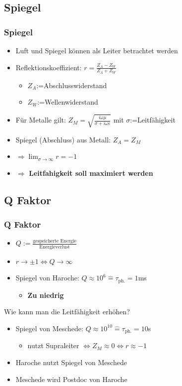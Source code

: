 \documentclass{beamer}
\begin{document}
\subsection{Spiegel}
\begin{frame}
	\frametitle{Spiegel}
	\begin{itemize}
		\item Luft und Spiegel können als Leiter betrachtet werden
		\item Reflektionskoeffizient: $r=\frac{Z_A-Z_W}{Z_A+Z_W}$
		      \begin{itemize}
			      \item $Z_A$:=Abschlusswiderstand
            \item $Z_W$:=Wellenwiderstand
		      \end{itemize}
		\item Für Metalle gilt: $Z_M=\sqrt{\frac{i\omega\mu}{\sigma+i\omega\epsilon}}$ mit $\sigma$:=Leitfähigkeit
		\item Spiegel (Abschluss) aus Metall: $Z_A=Z_M$
		\item $\Rightarrow \lim_{\sigma\rightarrow\infty}r=-1$
		\item $\Rightarrow$ \textbf{Leitfahigkeit soll maximiert werden}
	\end{itemize}
\end{frame}
\subsection{Q Faktor}
\begin{frame}
	\frametitle{Q Faktor}
	\begin{itemize}
		\item $Q:=\frac{\text{gespeicherte Energie}}{\text{Energieverlust}}$
		\item $r\rightarrow \pm1\Leftrightarrow Q\rightarrow\infty$
		\item Spiegel von Haroche: $Q \approx 10^6 \hat{=} \tau_{\text{ph.}}=1$ms
		      \begin{itemize}
            \item \textbf{Zu niedrig}
		      \end{itemize}
	\end{itemize}
\end{frame}
\begin{frame}
	\Large\center Wie kann man die Leitfähigkeit erhöhen?
\end{frame}
\begin{frame}
	\begin{itemize}
		\frametitle{Q Faktor}
		\item Spiegel von Meschede: $Q \approx 10^{10} \hat{=} \tau_{\text{ph.}}=10$s
		      \begin{itemize}
			      \item nutzt Supraleiter $\Leftrightarrow Z_M \approx 0 \Leftrightarrow r\approx-1$\
		      \end{itemize}
    \item Haroche nutzt Spiegel von Meschede
    \item Meschede wird Postdoc von Haroche
	\end{itemize}
\end{frame}
\end{document}
